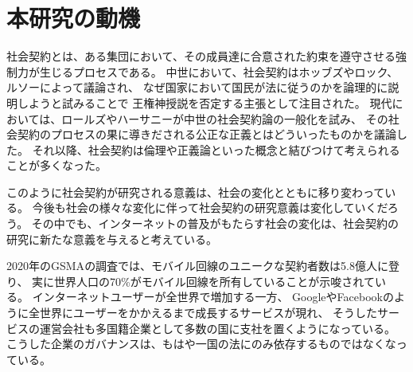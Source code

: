 



  \section{本研究の動機}
  社会契約とは、ある集団において、その成員達に合意された約束を遵守させる強制力が生じるプロセスである。
  中世において、社会契約はホッブズやロック、ルソーによって議論され、
  なぜ国家において国民が法に従うのかを論理的に説明しようと試みることで
  王権神授説を否定する主張として注目された。
  現代においては、ロールズやハーサニーが中世の社会契約論の一般化を試み、
  その社会契約のプロセスの果に導きだされる公正な正義とはどういったものかを議論した。
  それ以降、社会契約は倫理や正義論といった概念と結びつけて考えられることが多くなった。
  
  このように社会契約が研究される意義は、社会の変化とともに移り変わっている。
  今後も社会の様々な変化に伴って社会契約の研究意義は変化していくだろう。
  その中でも、インターネットの普及がもたらす社会の変化は、社会契約の研究に新たな意義を与えると考えている。

  2020年のGSMA\cite{gsma2020}の調査では、モバイル回線のユニークな契約者数は5.8億人に登り、
  実に世界人口の70\%がモバイル回線を所有していることが示唆されている。
  インターネットユーザーが全世界で増加する一方、
  Google\cite{google}やFacebook\cite{facebook}のように全世界にユーザーをかかえるまで成長するサービスが現れ、
  そうしたサービスの運営会社も多国籍企業として多数の国に支社を置くようになっている。
  こうした企業のガバナンスは、もはや一国の法にのみ依存するものではなくなっている。

